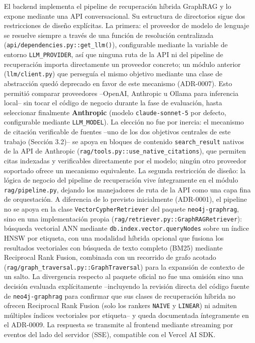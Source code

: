 \documentclass[11pt,a4paper,spanish]{book}
\numberwithin{equation}{chapter}
\numberwithin{figure}{chapter}
\numberwithin{table}{chapter}
\begin{document}
El backend implementa el pipeline de recuperación híbrida GraphRAG y lo expone mediante una API conversacional. Su estructura de directorios sigue dos restricciones de diseño explícitas. La primera: el proveedor de modelo de lenguaje se resuelve siempre a través de una función de resolución centralizada (\texttt{api/dependencies.py::get\_llm()}), configurable mediante la variable de entorno \texttt{LLM\_PROVIDER}, así que ninguna ruta de la API ni del pipeline de recuperación importa directamente un proveedor concreto; un módulo anterior (\texttt{llm/client.py}) que perseguía el mismo objetivo mediante una clase de abstracción quedó deprecado en favor de este mecanismo (ADR-0007). Esto permitió comparar proveedores --OpenAI, Anthropic u Ollama para inferencia local-- sin tocar el código de negocio durante la fase de evaluación, hasta seleccionar finalmente \textbf{Anthropic} (modelo \texttt{claude-sonnet-5} por defecto, configurable mediante \texttt{LLM\_MODEL}). La elección no fue por inercia: el mecanismo de citación verificable de fuentes --uno de los dos objetivos centrales de este trabajo (Sección 3.2)-- se apoya en bloques de contenido \texttt{search\_result} nativos de la API de Anthropic (\texttt{rag/tools.py::use\_native\_citations}), que permiten citas indexadas y verificables directamente por el modelo; ningún otro proveedor soportado ofrece un mecanismo equivalente. La segunda restricción de diseño: la lógica de negocio del pipeline de recuperación vive íntegramente en el módulo \texttt{rag/pipeline.py}, dejando los manejadores de ruta de la API como una capa fina de orquestación. A diferencia de lo previsto inicialmente (ADR-0001), el pipeline no se apoya en la clase \texttt{VectorCypherRetriever} del paquete \texttt{neo4j-graphrag}, sino en una implementación propia (\texttt{rag/retriever.py::GraphRAGRetriever}): búsqueda vectorial ANN mediante \texttt{db.index.vector.queryNodes} sobre un índice HNSW por etiqueta, con una modalidad híbrida opcional que fusiona los resultados vectoriales con búsqueda de texto completo (BM25) mediante Reciprocal Rank Fusion, combinada con un recorrido de grafo acotado (\texttt{rag/graph\_traversal.py::GraphTraversal}) para la expansión de contexto de un salto. La divergencia respecto al paquete oficial no fue una omisión sino una decisión evaluada explícitamente --incluyendo la revisión directa del código fuente de \texttt{neo4j-graphrag} para confirmar que sus clases de recuperación híbrida no ofrecen Reciprocal Rank Fusion (solo los rankers \texttt{NAIVE} y \texttt{LINEAR}) ni admiten múltiples índices vectoriales por etiqueta-- y queda documentada íntegramente en el ADR-0009. La respuesta se transmite al frontend mediante streaming por eventos del lado del servidor (SSE), compatible con el Vercel AI SDK.
\end{document}
